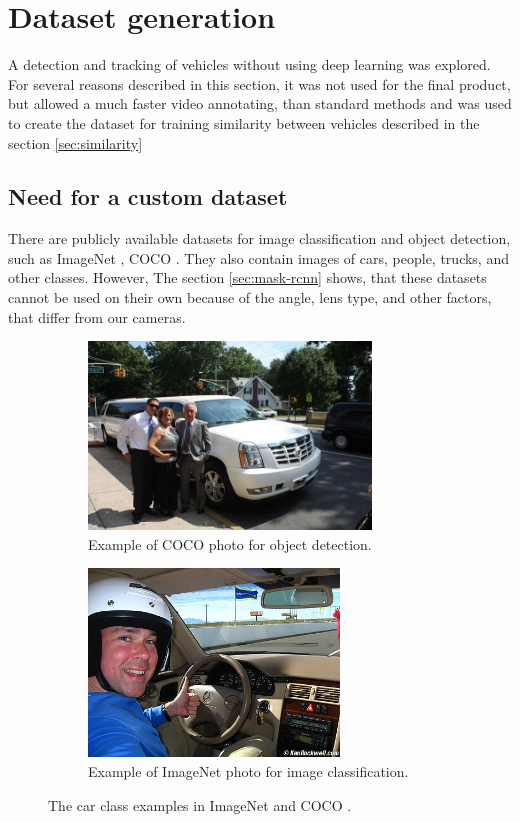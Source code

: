 \documentclass[a4paper,11pt,titlepage,twoside]{article}
\numberwithin{figure}{section}
\begin{document}
\clearpage
\section{Dataset generation}
\label{sec:classical}

A detection and tracking of vehicles without using deep learning was explored. For several reasons described in this section, it was not used for the final product, but allowed a much faster video annotating, than standard methods and was used to create the dataset for training similarity between vehicles described in the section \ref{sec:similarity}


\subsection{Need for a custom dataset}

There are publicly available datasets for image classification and object detection, such as ImageNet \cite{deng2009imagenet}, COCO \cite{lin2014microsoft}. They also contain images of cars, people, trucks, and other classes. However, The section \ref{sec:mask-rcnn} shows, that these datasets cannot be used on their own because of the angle, lens type, and other factors, that differ from our cameras.

\begin{figure}[h!]
    \begin{subfigure}[Sample1]{0.5\linewidth}
        \includegraphics[height=50mm]{fig/coco0.jpg}
        \caption{Example of COCO photo for object detection.}
        \label{fig:coco0}
    \end{subfigure}
    \qquad
    \begin{subfigure}[Sample1]{0.5\linewidth}    
        \includegraphics[height=50mm]{fig/imagenet3.jpg}  
        \caption{Example of ImageNet photo for image classification.}
        \label{fig:imagenet3}  
    \end{subfigure} 
    \caption{The car class examples in ImageNet \cite{deng2009imagenet} and COCO \cite{lin2014microsoft}.}
\end{figure}
\end{document}
